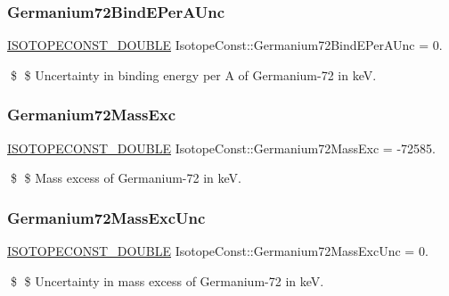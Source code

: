 \subsubsection{\texorpdfstring{Germanium72\+Bind\+E\+Per\+A\+Unc}{Germanium72BindEPerAUnc}}
{\footnotesize\ttfamily \mbox{\hyperlink{group___isotope_const-_macros_ga8f45a7272ce02c0b4c65c44636ed719a}{I\+S\+O\+T\+O\+P\+E\+C\+O\+N\+S\+T\+\_\+\+D\+O\+U\+B\+LE}} Isotope\+Const\+::\+Germanium72\+Bind\+E\+Per\+A\+Unc = 0.}

\$ \$ Uncertainty in binding energy per A of Germanium-\/72 in keV. \mbox{\label{group___isotope_const-_germanium-_ge72_gaad2c5ec854f3e734c95ac56a0ac456a0}} 
\subsubsection{\texorpdfstring{Germanium72\+Mass\+Exc}{Germanium72MassExc}}
{\footnotesize\ttfamily \mbox{\hyperlink{group___isotope_const-_macros_ga8f45a7272ce02c0b4c65c44636ed719a}{I\+S\+O\+T\+O\+P\+E\+C\+O\+N\+S\+T\+\_\+\+D\+O\+U\+B\+LE}} Isotope\+Const\+::\+Germanium72\+Mass\+Exc = -\/72585.}

\$ \$ Mass excess of Germanium-\/72 in keV. \mbox{\label{group___isotope_const-_germanium-_ge72_ga7ba78b2c00845c12a13e75d661b5b903}} 
\subsubsection{\texorpdfstring{Germanium72\+Mass\+Exc\+Unc}{Germanium72MassExcUnc}}
{\footnotesize\ttfamily \mbox{\hyperlink{group___isotope_const-_macros_ga8f45a7272ce02c0b4c65c44636ed719a}{I\+S\+O\+T\+O\+P\+E\+C\+O\+N\+S\+T\+\_\+\+D\+O\+U\+B\+LE}} Isotope\+Const\+::\+Germanium72\+Mass\+Exc\+Unc = 0.}

\$ \$ Uncertainty in mass excess of Germanium-\/72 in keV. \mbox{\label{group___isotope_const-_germanium-_ge72_ga75bd9a60805429ba89b7d782c804ca01}} 
